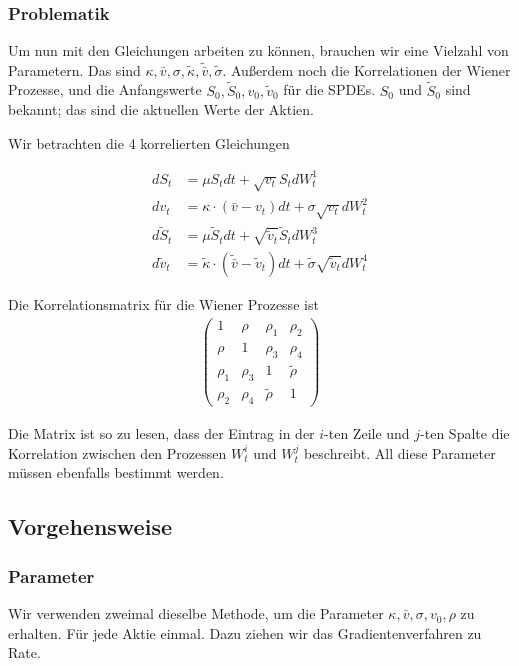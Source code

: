 \documentclass[12pt]{article}
\begin{document}
\subsubsection{Problematik}

Um nun mit den Gleichungen arbeiten zu können, brauchen wir eine Vielzahl von Parametern. Das sind $\kappa, \bar{v}, \sigma, \tilde{\kappa}, \tilde{\bar{v}}, \tilde{\sigma}$. Außerdem noch die Korrelationen der Wiener Prozesse, und die Anfangswerte $S_0, \tilde{S}_0, v_0, \tilde{v}_0$ für die SPDEs. $S_0$ und $\tilde{S}_0$ sind bekannt; das sind die aktuellen Werte der Aktien.

Wir betrachten die 4 korrelierten Gleichungen

\begin{align} \label{SPDE}
dS_t &= \mu S_t dt + \sqrt{v_t} S_t dW^1_t \\
dv_t &= \kappa\cdot(\bar{v}-v_t) dt + \sigma \sqrt{v_t}dW^2_t \\
d\tilde{S}_t &= \mu \tilde{S}_t dt + \sqrt{\tilde{v}_t} \tilde{S}_t dW^3_t \\
d\tilde{v}_t &= \tilde{\kappa}\cdot(\tilde{\bar{v}}-\tilde{v}_t) dt + \tilde{\sigma} \sqrt{\tilde{v}_t}dW^4_t
\end{align}

Die Korrelationsmatrix für die Wiener Prozesse ist
\begin{align} \label{korrel}
\left(
\begin{matrix}
1& \rho& \rho_1& \rho_2\\
\rho& 1& \rho_3& \rho_4\\
\rho_1& \rho_3& 1& \tilde{\rho}\\
\rho_2& \rho_4& \tilde{\rho}& 1
\end{matrix}
\right)
\end{align}

Die Matrix ist so zu lesen, dass der Eintrag in der $i$-ten Zeile und $j$-ten Spalte die Korrelation zwischen den Prozessen $W^i_t$ und $W^j_t$ beschreibt. All diese Parameter müssen ebenfalls bestimmt werden.


\subsection{Vorgehensweise}

\subsubsection{Parameter}

Wir verwenden zweimal dieselbe Methode, um die Parameter $\kappa, \bar{v}, \sigma, v_0, \rho$ zu erhalten. Für jede Aktie einmal. Dazu ziehen wir das Gradientenverfahren zu Rate.
\end{document}
